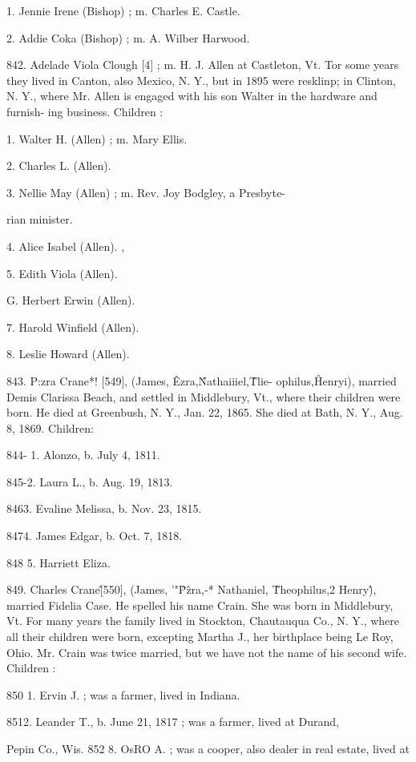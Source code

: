 1. Jennie Irene (Bishop) ; m. Charles E. Castle. 

2. Addie Coka (Bishop) ; m. A. Wilber Harwood. 

842. Adelade Viola Clough [4] ; m. H. J. Allen at Castleton, Vt. 
Tor some years they lived in Canton, also Mexico, N. Y., 
but in 1895 were resklinp; in Clinton, N. Y., where Mr. Allen 
is engaged with his son Walter in the hardware and furnish- 
ing business. Children : 

1. Walter H. (Allen) ; m. Mary Ellis. 

2. Charles L. (Allen). 

3. Nellie May (Allen) ; m. Rev. Joy Bodgley, a Presbyte- 

rian minister. 

4. Alice Isabel (Allen). , 

5. Edith Viola (Allen). 

G. Herbert Erwin (Allen). 

7. Harold Winfield (Allen). 

8. Leslie Howard (Allen). 

843. P:zra Crane*! [549], (James, \^ Ezra,\^ Nathaiiiel,\^ Tlie- 
ophilus,\^ Henryi), married Demis Clarissa Beach, and settled in 
Middlebury, Vt., where their children were born. He died at 
Greenbush, N. Y., Jan. 22, 1865. She died at Bath, N. Y., 
Aug. 8, 1869. Children: 

844- 1. Alonzo, b. July 4, 1811. 

845-2. Laura L., b. Aug. 19, 1813. 

8463. Evaline Melissa, b. Nov. 23, 1815. 

8474. James Edgar, b. Oct. 7, 1818. 

848 5. Harriett Eliza. 

849. Charles Crane\^ [550], (James, '"\^ P\^zra,-* Nathaniel, \^ 
Theophilus,2 Henry\^), married Fidelia Case. He spelled his 
name Crain. She was born in Middlebury, Vt. For many years 
the family lived in Stockton, Chautauqua Co., N. Y., where all 
their children were born, excepting Martha J., her birthplace 
being Le Roy, Ohio. Mr. Crain was twice married, but we have 
not the name of his second wife. Children : 

850  1. Ervin J. ; was a farmer, lived in Indiana. 

8512. Leander T., b. June 21, 1817 ; was a farmer, lived at Durand, 

Pepin Co., Wis. 
852  8. OsRO A. ; was a cooper, also dealer in real estate, lived at 

